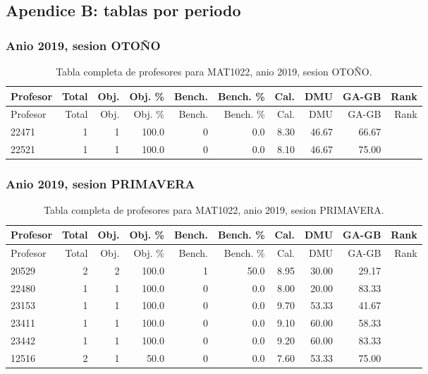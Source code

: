 \clearpage

\subsection{Apendice B: tablas por periodo}

\subsubsection{Anio 2019, sesion OTOÑO}

\begingroup
\scriptsize
\setlength{\tabcolsep}{3pt}
\begin{longtable}{lrrrrrrrrr}
\caption{Tabla completa de profesores para MAT1022, anio 2019, sesion OTOÑO.}\label{tab:prof-period-mat1022-2019-oto-o-especializado}\\
\toprule
Profesor & Total & Obj. & Obj. \% & Bench. & Bench. \% & Cal. & DMU & GA-GB & Rank \\
\midrule
\endfirsthead
\toprule
Profesor & Total & Obj. & Obj. \% & Bench. & Bench. \% & Cal. & DMU & GA-GB & Rank \\
\midrule
\endhead
22471 & 1 & 1 & 100.0 & 0 & 0.0 & 8.30 & 46.67 & 66.67 &  \\
22521 & 1 & 1 & 100.0 & 0 & 0.0 & 8.10 & 46.67 & 75.00 &  \\
\bottomrule
\end{longtable}
\endgroup

\subsubsection{Anio 2019, sesion PRIMAVERA}

\begingroup
\scriptsize
\setlength{\tabcolsep}{3pt}
\begin{longtable}{lrrrrrrrrr}
\caption{Tabla completa de profesores para MAT1022, anio 2019, sesion PRIMAVERA.}\label{tab:prof-period-mat1022-2019-primavera-especializado}\\
\toprule
Profesor & Total & Obj. & Obj. \% & Bench. & Bench. \% & Cal. & DMU & GA-GB & Rank \\
\midrule
\endfirsthead
\toprule
Profesor & Total & Obj. & Obj. \% & Bench. & Bench. \% & Cal. & DMU & GA-GB & Rank \\
\midrule
\endhead
20529 & 2 & 2 & 100.0 & 1 & 50.0 & 8.95 & 30.00 & 29.17 &  \\
22480 & 1 & 1 & 100.0 & 0 & 0.0 & 8.00 & 20.00 & 83.33 &  \\
23153 & 1 & 1 & 100.0 & 0 & 0.0 & 9.70 & 53.33 & 41.67 &  \\
23411 & 1 & 1 & 100.0 & 0 & 0.0 & 9.10 & 60.00 & 58.33 &  \\
23442 & 1 & 1 & 100.0 & 0 & 0.0 & 9.20 & 60.00 & 83.33 &  \\
12516 & 2 & 1 & 50.0 & 0 & 0.0 & 7.60 & 53.33 & 75.00 &  \\
\bottomrule
\end{longtable}
\endgroup

